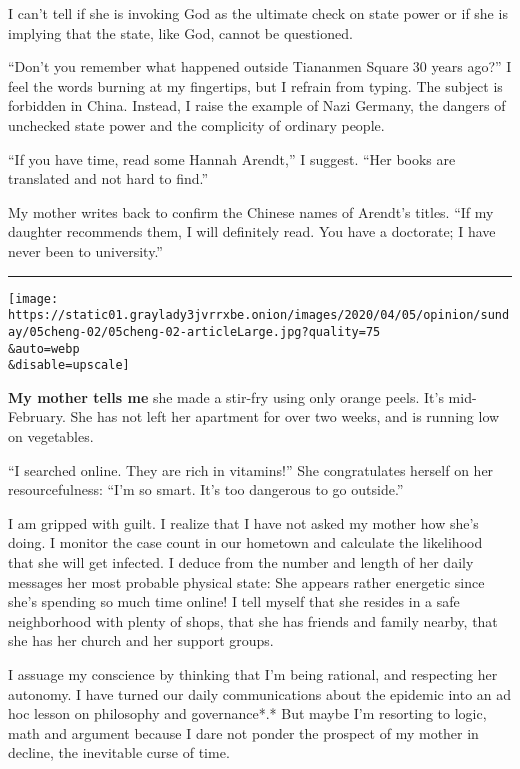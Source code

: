 I can't tell if she is invoking God as the ultimate check on state power
or if she is implying that the state, like God, cannot be questioned.

``Don't you remember what happened outside Tiananmen Square 30 years
ago?'' I feel the words burning at my fingertips, but I refrain from
typing. The subject is forbidden in China. Instead, I raise the example
of Nazi Germany, the dangers of unchecked state power and the complicity
of ordinary people.

``If you have time, read some Hannah Arendt,'' I suggest. ``Her books
are translated and not hard to find.''

My mother writes back to confirm the Chinese names of Arendt's titles.
``If my daughter recommends them, I will definitely read. You have a
doctorate; I have never been to university.''

\begin{center}\rule{0.5\linewidth}{\linethickness}\end{center}

\texttt{[image: https://static01.graylady3jvrrxbe.onion/images/2020/04/05/opinion/sunday/05cheng-02/05cheng-02-articleLarge.jpg?quality=75\\\&auto=webp\\\&disable=upscale]}

\textbf{My mother tells me} she made a stir-fry using only orange peels.
It's mid-February. She has not left her apartment for over two weeks,
and is running low on vegetables.

``I searched online. They are rich in vitamins!'' She congratulates
herself on her resourcefulness: ``I'm so smart. It's too dangerous to go
outside.''

I am gripped with guilt. I realize that I have not asked my mother how
she's doing. I monitor the case count in our hometown and calculate the
likelihood that she will get infected. I deduce from the number and
length of her daily messages her most probable physical state: She
appears rather energetic since she's spending so much time online! I
tell myself that she resides in a safe neighborhood with plenty of
shops, that she has friends and family nearby, that she has her church
and her support groups.

I assuage my conscience by thinking that I'm being rational, and
respecting her autonomy. I have turned our daily communications about
the epidemic into an ad hoc lesson on philosophy and governance*.* But
maybe I'm resorting to logic, math and argument because I dare not
ponder the prospect of my mother in decline, the inevitable curse of
time.

